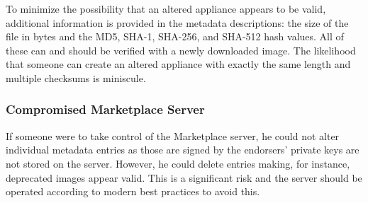 To minimize the possibility that an altered appliance appears to be
valid, additional information is provided in the metadata
descriptions: the size of the file in bytes and the MD5, SHA-1,
SHA-256, and SHA-512 hash values.  All of these can and should be
verified with a newly downloaded image.  The likelihood that someone
can create an altered appliance with exactly the same length and
multiple checksums is miniscule.

\subsubsection{Compromised Marketplace Server}

If someone were to take control of the Marketplace server, he could
not alter individual metadata entries as those are signed by the
endorsers' private keys are not stored on the server.  However, he
could delete entries making, for instance, deprecated images appear
valid.  This is a significant risk and the server should be operated
according to modern best practices to avoid this.


